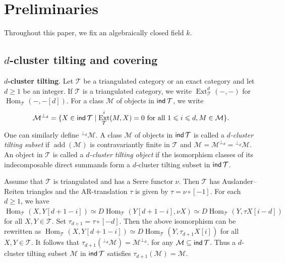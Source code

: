 \documentclass[12pt]{article}
\theoremstyle{plain}
\theoremstyle{definition}
\DeclareMathOperator{\add}{add}
\DeclareMathOperator{\Ext}{Ext}
\DeclareMathOperator{\Hom}{Hom}
\DeclareMathOperator{\supp}{\sf supp}
\DeclareMathOperator{\ind}{\sf ind}
\newcommand{\T}{\mathcal{T}}
\def\modcat#1{{\sf mod}\mbox{-}{#1}}
\renewcommand{\leq}{\leqslant}
\renewcommand{\geq}{\geqslant}
\begin{document}
 


\section{Preliminaries}
Throughout this paper, we fix an algebraically closed field $k$. 

\subsection{$d$-cluster tilting and covering}

{\bf $d$-cluster tilting}.  Let $\T$ be a triangulated category or an exact category and let $d\geq 1$ be an integer. If $\T$ is a triangulated category, we write $\Ext_{\T}^d(-,-)$ for $\Hom_{\T}(-,-[d])$. For a class $\mathcal{M}$ of objects in $\ind\T$, we write 
\[\mathcal{M}^{\perp_d}=\{X\in\ind\T\mid \Ext_{\T}^i(M,X)=0 \mbox{ for all }1\leq i\leq d, M\in\mathcal{M}\}.\]
One can similarly define ${}^{\perp_d}\mathcal{M}$. A class $\mathcal{M}$ of objects in $\ind\T$ is called a {\em $d$-cluster tilting subset} if $\add(\mathcal{M})$ is contravariantly finite in $\T$ and $\mathcal{M}=\mathcal{M}^{\perp_d}={}^{\perp_d}\mathcal{M}$. 
An object in $\T$ is called a {\em $d$-cluster tilting object} if the isomorphism classes of its indecomposable direct summands form a $d$-cluster tilting subset in $\ind\T$.  

Assume that $\T$ is triangulated and  has a Serre functor $\nu$. Then $\T$ has Auslander--Reiten triangles and the AR-translation $\tau$ is given by $\tau = \nu \circ [-1]$. For each $d\geq 1$, we have 
\(\Hom_{\T}(X,Y[d+1-i])\simeq D\Hom_{\T}(Y[d+1-i],\nu X)\simeq D\Hom_{\T}(Y,\tau X[i-d])\) for all $X,Y\in\T$. Set $\tau_{d+1}=\tau\circ[-d]$. Then the above isomorphism can be rewritten as \(\Hom_{\T}(X,Y[d+1-i])\simeq D\Hom_{\T}(Y,\tau_{d+1} X[i])\) for all $X,Y\in\T$. It follows that 
\(\tau_{d+1}\left({}^{\perp_d}\mathcal{M}\right)=\mathcal{M}^{\perp_d}.\)
for any $\mathcal{M}\subseteq\ind\T$. Thus a $d$-cluster tilting subset $\mathcal{M}$ in $\ind\T$ satisfies $\tau_{d+1}(\mathcal{M})=\mathcal{M}$. 

\end{document}
